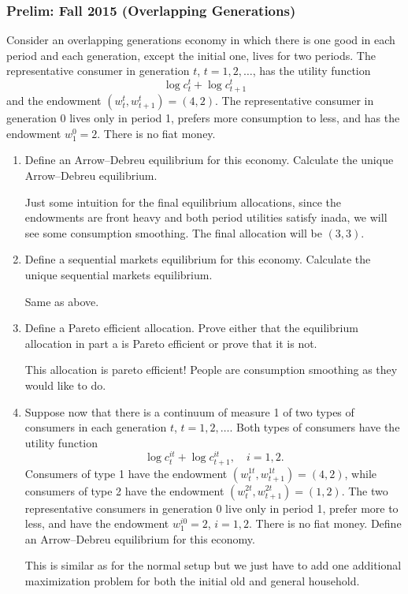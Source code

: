 \documentclass[11pt,english]{article}
\begin{document}
\subsubsection{Prelim: Fall 2015 (Overlapping Generations)}
Consider an overlapping generations economy in which there is one good in each
period and each generation, except the initial one, lives for two periods. The
representative consumer in generation $t$, $t = 1, 2, \ldots$, has the
utility function
\[
    \log c_t^t + \log c_{t+1}^t
\]
and the endowment $(w_t^t, w_{t+1}^t) = (4, 2)$. The representative consumer
in generation 0 lives only in period 1, prefers more consumption to less, and
has the endowment $w_1^0 = 2$. There is no fiat money.
 
\begin{enumerate}
    \item[a)] Define an Arrow--Debreu equilibrium for this economy. Calculate
        the unique Arrow--Debreu equilibrium.
    \begin{solution}
 Just some intuition for the final equilibrium allocations, since the endowments are front heavy and both period utilities satisfy inada, we will see some consumption smoothing. The final allocation will be $(3,3)$.
    \end{solution}
 
    \item[b)] Define a sequential markets equilibrium for this economy.
        Calculate the unique sequential markets equilibrium.
    \begin{solution}
 Same as above.
    \end{solution}
 
    \item[c)] Define a Pareto efficient allocation. Prove either that the
        equilibrium allocation in part a is Pareto efficient or prove that it
        is not.
    \begin{solution}
 This allocation is pareto efficient! People are consumption smoothing as they would like to do. 
    \end{solution}
 
    \item[d)] Suppose now that there is a continuum of measure 1 of two types
        of consumers in each generation $t$, $t = 1, 2, \ldots$. Both types of
        consumers have the utility function
        \[
            \log c_t^{it} + \log c_{t+1}^{it}, \quad i = 1, 2.
        \]
        Consumers of type 1 have the endowment $(w_t^{1t}, w_{t+1}^{1t}) =
        (4, 2)$, while consumers of type 2 have the endowment $(w_t^{2t},
        w_{t+1}^{2t}) = (1, 2)$. The two representative consumers in
        generation 0 live only in period 1, prefer more to less, and have the
        endowment $w_1^{i0} = 2$, $i = 1, 2$. There is no fiat money. Define
        an Arrow--Debreu equilibrium for this economy.
    \begin{solution}
 This is similar as for the normal setup but we just have to add one additional maximization problem for both the initial old and general household.
    \end{solution}
 

\end{enumerate}
\end{document}
